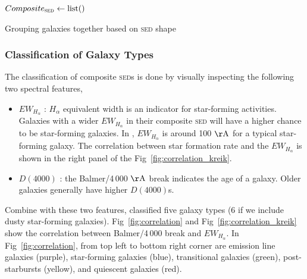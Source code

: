 \documentclass{ar-1col}
\begin{document}
\begin{algorithm}
    $Composite_\textsc{sed} \leftarrow \mathrm{list}()$


    \caption{Grouping galaxies together based on \textsc{sed} shape}
    \label{algorithm:grouping}
\end{algorithm}



\subsubsection{Classification of Galaxy Types}

The classification of composite \textsc{sed}s is done by visually inspecting the following two spectral features,

\begin{itemize}
    \item $EW_{H_\alpha}$ : $H_\alpha$ equivalent width is an indicator for star-forming activities. Galaxies with a wider $EW_{H_\alpha}$ in their composite \textsc{sed} will have a higher chance to be star-forming galaxies. In \citet{Forrest2018}, $EW_{H_\alpha}$ is around 100 $\mathrm{\AA}$  for a typical star-forming galaxy. The correlation between star formation rate and the $EW_{H_\alpha}$ is shown in the right panel of the Fig~\ref{fig:correlation_kreik}.
    \item $D(4000)$ : the Balmer/4\,000 $\mathrm{\AA}$   break indicates the age of a galaxy. Older galaxies generally have higher $D(4000)$s. 
\end{itemize}

Combine with these two features, \citet{Forrest2018} classified five galaxy types (6 if we include dusty star-forming galaxies).
Fig~\ref{fig:correlation} and Fig~\ref{fig:correlation_kreik} show the correlation between Balmer/4\,000 break and $EW_{H_\alpha}$.
In Fig~\ref{fig:correlation}, from top left to bottom right corner are emission line galaxies (purple), star-forming galaxies (blue), transitional galaxies (green), post-starbursts (yellow), and quiescent galaxies (red).
\end{document}
